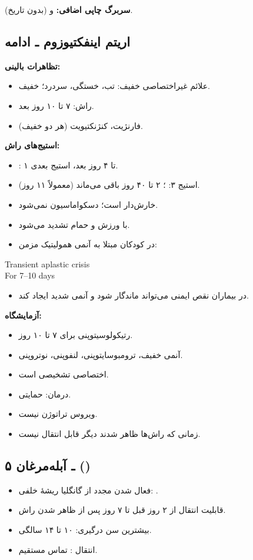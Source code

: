 \documentclass[12pt,a4paper]{article}
\begin{document}
\textbf{سربرگ چاپی اضافی:}  و  (بدون تاریخ).
\subsection*{اریتم اینفکتیوزوم ـ ادامه}
\textbf{تظاهرات بالینی:}
\begin{itemize}
\item علائم غیراختصاصی خفیف: تب، خستگی، سردرد؛ خفیف.
\item راش: ۷ تا ۱۰ روز بعد.
\item فارنژیت، کنژنکتیویت (هر دو خفیف).
\end{itemize}
\textbf{استیج‌های راش:}
\begin{itemize}
\item {}: ۱ تا ۴ روز بعد، استیج بعدی.
\item استیج ۳: ؛ ۲ تا ۴۰ روز باقی می‌ماند (معمولاً ۱۱ روز).
\item خارش‌دار است؛ دسکواماسیون نمی‌شود.
\item با ورزش و حمام تشدید می‌شود.
\end{itemize}
\begin{itemize}
\item در کودکان مبتلا به آنمی همولیتیک مزمن:
\end{itemize}
\begin{latin}
Transient aplastic crisis\\
For 7--10 days
\end{latin}
\begin{itemize}
\item در بیماران نقص ایمنی می‌تواند ماندگار شود و آنمی شدید ایجاد کند.
\end{itemize}
\textbf{آزمایشگاه:}
\begin{itemize}
\item رتیکولوسیتوپنی برای ۷ تا ۱۰ روز.
\item آنمی خفیف، ترومبوسایتوپنی، لنفوپنی، نوتروپنی.
\item {} اختصاصی تشخیصی است.
\end{itemize}
\begin{itemize}
\item درمان: حمایتی.
\item ویروس  تراتوژن نیست.
\item زمانی که راش‌ها ظاهر شدند دیگر قابل انتقال نیست.
\end{itemize}

\subsection*{۵ ـ آبله‌مرغان ()}
\begin{itemize}
\item فعال شدن مجدد از گانگلیا ریشهٔ خلفی: .
\item قابلیت انتقال از ۲ روز قبل تا ۷ روز پس از ظاهر شدن راش.
\item بیشترین سن درگیری: ۱۰ تا ۱۴ سالگی.
\item انتقال : تماس مستقیم.
\end{itemize}
\end{document}
